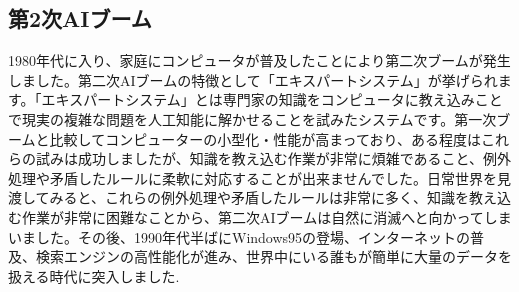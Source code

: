 \subsection{第2次AIブーム}
1980年代に入り、家庭にコンピュータが普及したことにより第二次ブームが発生しました。第二次AIブームの特徴として「エキスパートシステム」が挙げられます。「エキスパートシステム」とは専門家の知識をコンピュータに教え込みことで現実の複雑な問題を人工知能に解かせることを試みたシステムです。第一次ブームと比較してコンピューターの小型化・性能が高まっており、ある程度はこれらの試みは成功しましたが、知識を教え込む作業が非常に煩雑であること、例外処理や矛盾したルールに柔軟に対応することが出来ませんでした。日常世界を見渡してみると、これらの例外処理や矛盾したルールは非常に多く、知識を教え込む作業が非常に困難なことから、第二次AIブームは自然に消滅へと向かってしまいました。その後、1990年代半ばにWindows95の登場、インターネットの普及、検索エンジンの高性能化が進み、世界中にいる誰もが簡単に大量のデータを扱える時代に突入しました.\\
